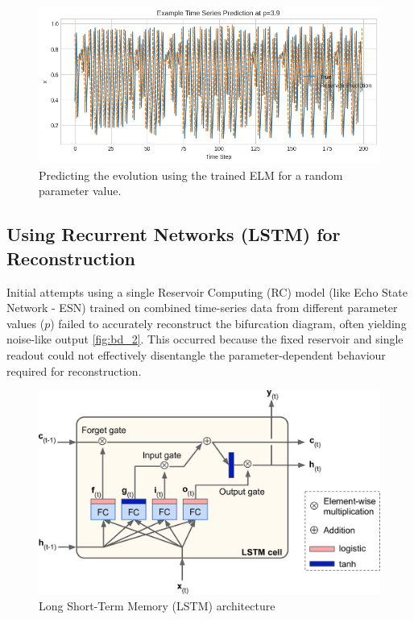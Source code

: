 \documentclass[numbered]{ivt-style/standard}
\begin{document}
\begin{figure}[H]
    \centering
    \includegraphics[width=01.0\linewidth]{figures/bd_5_prediction_for_specific_value.png}
    \caption{Predicting the evolution using the trained ELM for a random parameter value.}
    \label{fig:bd_5}
\end{figure}



\subsection{Using Recurrent Networks (LSTM) for Reconstruction}

Initial attempts using a single Reservoir Computing (RC) model (like Echo State Network - ESN) trained on combined time-series data from different parameter values ($p$) failed to accurately reconstruct the bifurcation diagram, often yielding noise-like output \ref{fig:bd_2}. This occurred because the fixed reservoir and single readout could not effectively disentangle the parameter-dependent behaviour required for reconstruction.


\begin{figure}[H]
    \centering
    \includegraphics[width=1\linewidth]{figures/LSTM_arch.png}
    \caption{Long Short-Term Memory (LSTM) architecture}
    \label{fig:lstm_arch}
\end{figure}
\end{document}
